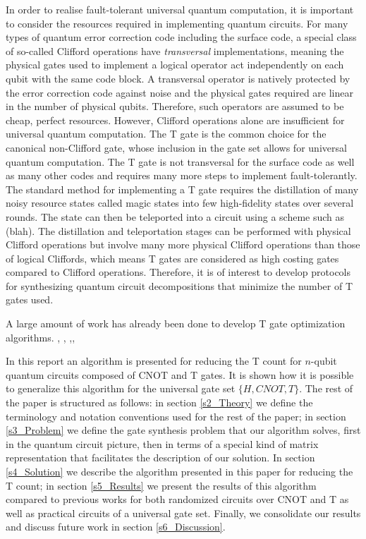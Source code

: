 \documentclass{article}
\theoremstyle{definition}
\theoremstyle{problem}
\theoremstyle{lemma}
\begin{document}
	In order to realise fault-tolerant universal quantum computation, it is important to consider the resources required in implementing quantum circuits. For many types of quantum error correction code including the surface code, a special class of so-called Clifford operations have \emph{transversal} implementations, meaning the physical gates used to implement a logical operator act independently on each qubit with the same code block. A transversal operator is natively protected by the error correction code against noise and the physical gates required are linear in the number of physical qubits. Therefore, such operators are assumed to be cheap, perfect resources. However, Clifford operations alone are insufficient for universal quantum computation. The T gate is the common choice for the canonical non-Clifford gate, whose inclusion in the gate set allows for universal quantum computation. The T gate is not transversal for the surface code as well as many other codes and requires many more steps to implement fault-tolerantly. The standard method for implementing a T gate requires the distillation of many noisy resource states called magic states into few high-fidelity states over several rounds. The state can then be teleported into a circuit using a scheme such as (blah). The distillation and teleportation stages can be performed with physical Clifford operations but involve many more physical Clifford operations than those of logical Cliffords, which means T gates are considered as high costing gates compared to Clifford operations.
	Therefore, it is of interest to develop protocols for synthesizing quantum circuit decompositions that minimize the number of T gates used.%
	
	A large amount of work has already been done to develop T gate optimization algorithms.  \cite{3_Amy_2013}, \cite{4_Amy_2013}, \cite{5_Gosset_2013},\cite{8_Amy_2016}, \cite{1_Campbell_2017}
	
	In this report an algorithm is presented for reducing the T count for $n$-qubit quantum circuits composed of CNOT and T gates. It is shown how it is possible to generalize this algorithm for the universal gate set $\{H, CNOT, T\}$. The rest of the paper is structured as follows: in section \ref{s2_Theory} we define the terminology and notation conventions used for the rest of the paper; in section \ref{s3_Problem} we define the gate synthesis problem that our algorithm solves, first in the quantum circuit picture, then in terms of a special kind of matrix representation that facilitates the description of our solution. In section \ref{s4_Solution} we describe the algorithm presented in this paper for reducing the T count; in section \ref{s5_Results} we present the results of this algorithm compared to previous works for both randomized circuits over CNOT and T as well as practical circuits of a universal gate set. Finally, we consolidate our results and discuss future work in section \ref{s6_Discussion}.
	
\end{document}
